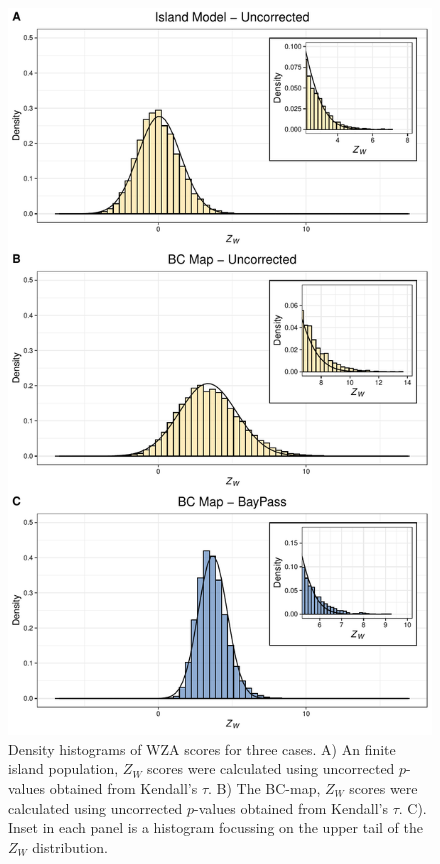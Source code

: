 \documentclass[10pt,twoside,lineno, twocolumn]{GSA_format}
\begin{document}
\begin{figure}
  \includegraphics[width=\linewidth,keepaspectratio]{Plots/neutralResults_histogram.pdf} 

  \caption{Density histograms of WZA scores for three cases. A) An finite island population, $Z_W$ scores were calculated using uncorrected $p$-values obtained from Kendall's $\tau$. B)  The BC-map, $Z_W$ scores were calculated using uncorrected $p$-values obtained from Kendall's $\tau$. C). Inset in each panel is a histogram focussing on the upper tail of the $Z_W$ distribution.}
  
  \label{fig:NeutralHistograms}
\end{figure}
\end{document}
